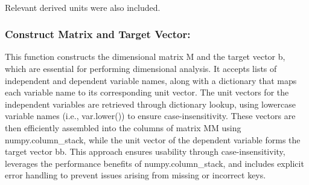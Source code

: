 \documentclass{article}
\begin{document}
\begin{table}[H]
\centering
{}
\caption{SI base and derived units with their corresponding vectorised representations.}
\label{tab:si_units_extended}
\end{table}\\





Relevant derived units were also included.\\

\subsubsection{Construct Matrix and Target Vector:}


This function constructs the dimensional matrix M and the target vector b, which are essential for performing dimensional analysis. It accepts lists of independent and dependent variable names, along with a dictionary that maps each variable name to its corresponding unit vector. The unit vectors for the independent variables are retrieved through dictionary lookup, using lowercase variable names (i.e., var.lower()) to ensure case-insensitivity. These vectors are then efficiently assembled into the columns of matrix MM using numpy.column\_stack, while the unit vector of the dependent variable forms the target vector bb. This approach ensures usability through case-insensitivity, leverages the performance benefits of numpy.column\_stack, and includes explicit error handling to prevent issues arising from missing or incorrect keys.\\
\end{document}
